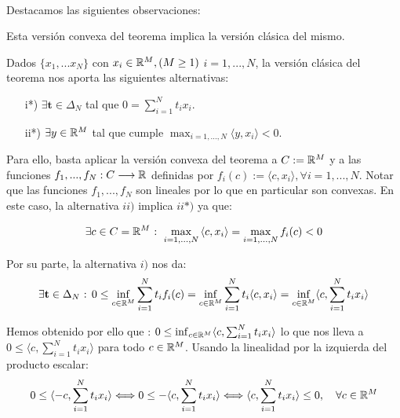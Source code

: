 	\paragraph{} Destacamos las siguientes observaciones:
	
	\begin{observacion}
		Esta versión convexa del teorema implica la versión clásica del mismo.
	\end{observacion}

	Dados $ \{x_1,...x_N\}$ con $ x_i \in \mathbb{R}^M , (M \geq 1 )$ $i=1,...,N$, la versión clásica del teorema nos aporta las siguientes alternativas:

	\begin{itemize}
		\item[i*)] $ \exists \mathbf{t} \in \Delta_N $ tal que $ 0 = \sum_{i=1}^{N}{t_i x_i}$.
		\item[ii*)] $ \exists y \in \mathbb{R}^M $ tal que cumple $ \max_{i=1,...,N} \langle y, x_i \rangle < 0 $.
	\end{itemize}

	Para ello, basta aplicar la versión convexa del teorema a $ C := \mathbb{R}^M $ y a las funciones $ f_1,...,f_N : C \longrightarrow \mathbb{R} $ definidas por $ f_i(c):=\langle c,x_i \rangle , \forall i=1,...,N  $. Notar que las funciones $ f_1,...,f_N $ son lineales por lo que en particular son convexas. En este caso, la alternativa $ ii) $ implica $ ii*) $ ya que:
	
	\begin{equation*}
		\exists c \in C = \mathbb{R}^M \text{ : } \max_{i=1,...,N} {\langle c,x_i \rangle}  =  \max_{i=1,...,N}f_i (c) < 0 
	\end{equation*}
	
	Por su parte, la alternativa $ i) $ nos da:
	\begin{equation*}
		\exists \mathbf{t} \in \Delta_N \text{ : } 0 \leq \inf_{c \in \mathbb{R}^M}  \sum_{i=1}^{N}{t_i f_i(c) } = \inf_{c \in \mathbb{R}^M} \sum_{i=1}^{N}{t_i\langle c,x_i \rangle} = \inf_{c \in \mathbb{R}^M} \langle c, \sum_{i=1}^{N}{t_i x_i} \rangle 
	\end{equation*}
	
	Hemos obtenido por ello que : $0  \leq \inf_{c \in \mathbb{R}^M} \langle c, \sum_{i=1}^{N}{t_i x_i} \rangle  $ lo que nos lleva a $ 0 \leq \langle c, \sum_{i=1}^{N}{t_i x_i} \rangle  $ para todo $ c \in \mathbb{R}^M $. Usando la linealidad por la izquierda del producto escalar:
	\[
	0 \leq \langle -c, \sum_{i=1}^{N}{t_i x_i} \rangle \Longleftrightarrow 	0 \leq -\langle c, \sum_{i=1}^{N}{t_i x_i} \rangle 
	\Longleftrightarrow  \langle c, \sum_{i=1}^{N}{t_i x_i}\rangle \leq 0, \quad \forall c \in \mathbb{R}^M
	\]
	
